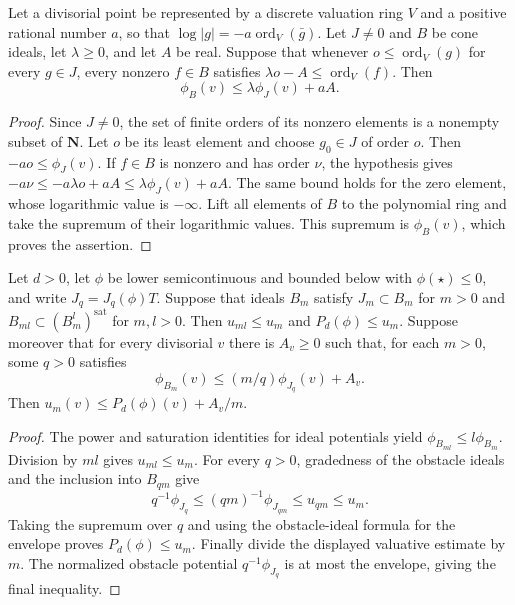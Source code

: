 \begin{lemma}
\label{lem:c0n-orders-to-potentials}
\leanok
Let a divisorial point be represented by a discrete valuation ring $V$ and
a positive rational number $a$, so that $\log|g|=-a\operatorname{ord}_V(\bar g)$.
Let $J\ne0$ and $B$ be cone ideals, let $\lambda\ge0$, and let $A$ be real.
Suppose that whenever $o\le\operatorname{ord}_V(g)$ for every $g\in J$,
every nonzero $f\in B$ satisfies
$\lambda o-A\le\operatorname{ord}_V(f)$.  Then
\[
 \phi_B(v)\le\lambda\phi_J(v)+aA.
\]
\end{lemma}
\begin{proof}
Since $J\ne0$, the set of finite orders of its nonzero elements is a
nonempty subset of $\mathbf N$.  Let $o$ be its least element and choose
$g_0\in J$ of order $o$.  Then $-ao\le\phi_J(v)$.  If $f\in B$ is
nonzero and has order $\nu$, the hypothesis gives
$-a\nu\le-a\lambda o+aA\le\lambda\phi_J(v)+aA$.
The same bound holds for the zero element, whose logarithmic value is
$-\infty$.  Lift all elements of $B$ to the polynomial ring and take the
supremum of their logarithmic values.  This supremum is $\phi_B(v)$,
which proves the assertion.
\end{proof}

\begin{lemma}
\label{lem:c0n-cone-ideal-bounds}
\leanok
Let $d>0$, let $\phi$ be lower semicontinuous and bounded below with
$\phi(\star)\le0$, and write $J_q=J_q(\phi)T$.  Suppose that ideals $B_m$
satisfy $J_m\subset B_m$ for $m>0$ and
$B_{ml}\subset(B_m^l)^{\mathrm{sat}}$ for $m,l>0$.
Then $u_{ml}\le u_m$ and $P_d(\phi)\le u_m$.
Suppose moreover that for every divisorial $v$ there is $A_v\ge0$ such
that, for each $m>0$, some $q>0$ satisfies
\[
 \phi_{B_m}(v)\le (m/q)\phi_{J_q}(v)+A_v.
\]
Then $u_m(v)\le P_d(\phi)(v)+A_v/m$.
\end{lemma}
\begin{proof}
The power and saturation identities for ideal potentials yield
$\phi_{B_{ml}}\le l\phi_{B_m}$.  Division by $ml$ gives $u_{ml}\le u_m$.
For every $q>0$, gradedness of the obstacle ideals and the inclusion into
$B_{qm}$ give
\[
 q^{-1}\phi_{J_q}\le(qm)^{-1}\phi_{J_{qm}}
 \le u_{qm}\le u_m.
\]
Taking the supremum over $q$ and using the obstacle-ideal formula for the
envelope proves $P_d(\phi)\le u_m$.  Finally divide the displayed
valuative estimate by $m$.  The normalized obstacle potential
$q^{-1}\phi_{J_q}$ is at most the envelope, giving the final inequality.
\end{proof}

